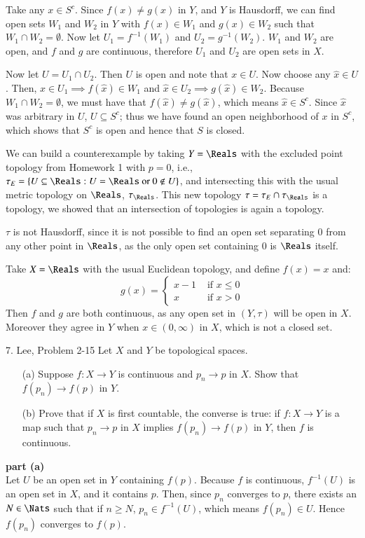 \documentclass{homework}
\newcommand{\ra}{\rightarrow}
\begin{document}
Take any $x\in S^c$.  Since $f(x)\ne g(x)$ in $Y$, and $Y$ is Hausdorff,
we can find open sets $W_1$ and $W_2$ in $Y$ with $f(x)\in W_1$ and
$g(x)\in W_2$ such that $W_1 \cap W_2=\emptyset$.  Now let $U_1=f^{-1}(W_1)$
and $U_2=g^{-1}(W_2)$. $W_1$ and $W_2$ are open, and $f$ and $g$ are
continuous, therefore $U_1$ and $U_2$ are open sets in $X$.

Now let $U=U_1\cap U_2$.  Then $U$ is open and note that $x\in U$.
Now choose any $\hat x\in U$.  Then, $\hat x\in U_1\implies f(\hat x)\in W_1$
and $\hat x\in U_2\implies g(\hat x)\in W_2$.  Because
$W_1\cap W_2=\emptyset$, we must have that $f(\hat x)\ne g(\hat x)$,
which means $\hat x\in S^c$. Since $\hat x$ was arbitrary in $U$,
$U\subseteq S^c$; thus we have found an open neighborhood of
$x$ in $S^c$, which shows that $S^c$ is open and hence that $S$ is closed.

We can build a counterexample by taking $Y=\Reals$ with the
excluded point topology from Homework 1 with $p=0$, i.e.,
$\tau_E = \{ U \subseteq \Reals : U=\Reals \text{ or } 0\not\in U\}$,
and intersecting this with the usual metric topology on $\Reals$,
$\tau_\Reals$.  This new topology $\tau=\tau_E\cap\tau_\Reals$ is
a topology, we showed that an intersection of topologies is again
a topology.

$\tau$ is not Hausdorff, since it is not possible to find an open set
separating $0$ from any other point in $\Reals$, as the only open
set containing $0$ is $\Reals$ itself.

Take $X=\Reals$ with the usual Euclidean topology, and define
$f(x) = x$ and:
$$ g(x) =
\begin{cases}
x-1 &\text{ if } x\le 0\\
x   &\text{ if } x>0
\end{cases} $$
Then $f$ and $g$ are both continuous, as any open set
in $(Y,\tau)$ will be open in $X$.
Moreover they agree in $Y$
when $x\in(0,\infty)$ in $X$, which is not a closed set.

\hrulefill
\begin{exercise}{7. Lee, Problem 2-15}
Let $X$ and $Y$ be topological spaces.
\begin{itemize}
\item[(a)] Suppose $f:X\ra Y$ is continuous and $p_n\ra p$ in $X$.  Show that
$f(p_n)\ra f(p)$ in $Y$.
\item[(b)] Prove that if $X$ is first countable, the converse is true: if $f:X\ra Y$
is a map such that $p_n\ra p$ in $X$ implies $f(p_n)\ra f(p)$ in $Y$, then $f$ is
continuous.
\end{itemize}
\end{exercise}
\solution
\textbf{part (a)}\\
Let $U$ be an open set in $Y$ containing $f(p)$.  Because $f$ is continuous,
$f^{-1}(U)$ is an open set in $X$, and it contains $p$.  Then, since $p_n$
converges to $p$, there exists an $N\in\Nats$ such that if $n\ge N$,
$p_n\in f^{-1}(U)$, which means $f(p_n)\in U$.  Hence $f(p_n)$ converges to $f(p)$.
\end{document}
